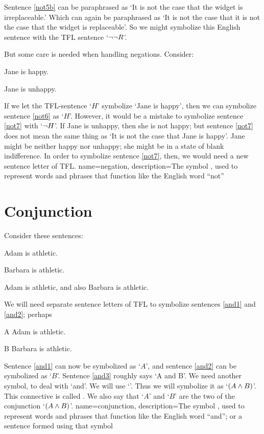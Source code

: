 Sentence \ref{not5b} can be paraphrased as `It is not the case that the widget is irreplaceable.' Which can again be paraphrased as `It is not the case that it is not the case that the widget is replaceable'. So we might symbolize this English sentence with the TFL sentence `$\neg\neg R$'.

But some care is needed when handling negations. Consider:
	\begin{earg}
		\item[\ex{not6}] Jane is happy.
		\item[\ex{not7}] Jane is unhappy.
	\end{earg}
If we let the TFL-sentence `$H$' symbolize  `Jane is happy', then we can symbolize sentence \ref{not6} as `$H$'. However, it would be a mistake to symbolize sentence \ref{not7} with `$\neg{H}$'. If Jane is unhappy, then she is not happy; but sentence \ref{not7} does not mean the same thing as `It is not the case that Jane is happy'. Jane might be neither happy nor unhappy; she might be in a state of blank indifference. In order to symbolize sentence \ref{not7}, then, we would need a new sentence letter of TFL.
{
name=negation,
description={The symbol \enot, used to represent words and phrases that function like the English word ``not''}
}

\section{Conjunction}
\label{s:ConnectiveConjunction}

Consider these sentences:
	\begin{earg}
		\item[\ex{and1}]Adam is athletic.
		\item[\ex{and2}]Barbara is athletic.
		\item[\ex{and3}]Adam is athletic, and also Barbara is athletic.
	\end{earg}
We will need separate sentence letters of TFL to symbolize sentences \ref{and1} and \ref{and2}; perhaps
	\begin{ekey}
		\item[A] Adam is athletic.
		\item[B] Barbara is athletic.
	\end{ekey}
Sentence \ref{and1} can now be symbolized as `$A$', and sentence \ref{and2} can be symbolized as `$B$'. Sentence \ref{and3} roughly says `A and B'. We need another symbol, to deal with `and'. We will use `\eand'. Thus we will symbolize it as `$(A\wedge B)$'. This connective is called . We also say that `$A$' and `$B$' are the two  of the conjunction `$(A \wedge B)$'.
{
name=conjunction,
description={The symbol \eand, used to represent words and phrases that function like the English word ``and''; or a sentence formed using that symbol}
}

